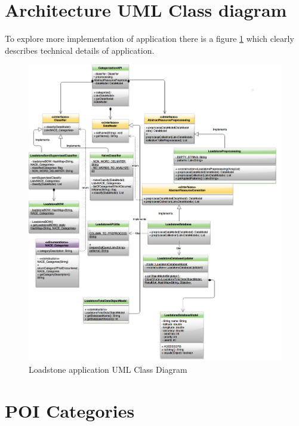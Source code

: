 \section{Architecture UML Class diagram}
To explore more implementation of application there is a figure \ref{fig:@=loadstone_uml} which clearly describes technical details of application.
\begin{figure}
	\centering
	\includegraphics[scale=0.4]{UML.png}
	\caption{Loadstone application UML Class Diagram}
	\label{fig:@=loadstone_uml}
\end{figure}

\section{POI Categories}

